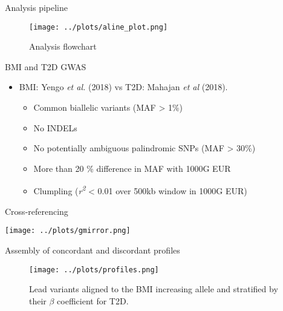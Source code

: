 \documentclass[presentation]{beamer}
\begin{document}
\begin{frame}[label={sec:org3ba0264}]{Analysis pipeline}
\begin{figure}[htbp]
\centering
\texttt{[image: ../plots/aline\_plot.png]}
\caption{Analysis flowchart}
\end{figure}
\end{frame}
\begin{frame}[label={sec:orged3abfe}]{BMI and T2D GWAS}
\begin{itemize}
\item BMI: Yengo \emph{et al.} (2018) vs T2D: Mahajan \emph{et al} (2018).
\begin{itemize}
\item Common biallelic variants (MAF > 1\%)
\item No INDELs
\item No potentially ambiguous palindromic SNPs (MAF > 30\%)
\item More than 20 \% difference in MAF with 1000G EUR
\item Clumpling (\emph{r\textsuperscript{2}} < 0.01 over 500kb window in 1000G EUR)
\end{itemize}
\end{itemize}
\end{frame}
\begin{frame}[label={sec:orga5ecbc1}]{Cross-referencing}
\begin{center}
\texttt{[image: ../plots/gmirror.png]}
\end{center}
\end{frame}
\begin{frame}[label={sec:org2ce411b}]{Assembly of concordant and discordant profiles}
\begin{figure}[htbp]
\centering
\texttt{[image: ../plots/profiles.png]}
\caption{Lead variants aligned to the BMI increasing allele and stratified by their \(\beta\) coefficient for T2D.}
\end{figure}
\end{frame}
\end{document}
